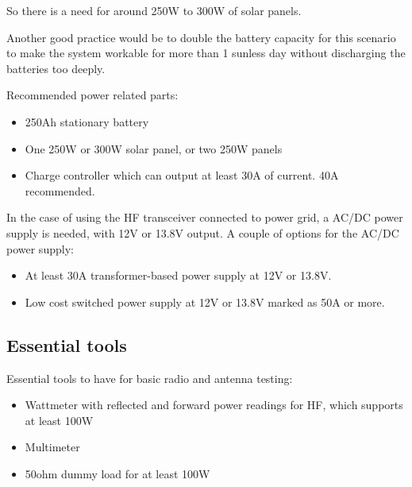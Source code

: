 \documentclass[11pt,a4paper]{article}
\begin{document}
So there is a need for around 250W to 300W of solar panels.

Another good practice would be to double the battery capacity for this
scenario to make the system workable for more than 1 sunless day without
discharging the batteries too deeply.

Recommended power related parts:
\begin{itemize}
\item 250Ah stationary battery
\item One 250W or 300W solar panel, or two 250W panels
\item Charge controller which can output at least 30A of current. 40A
  recommended.
\end{itemize}

In the case of using the HF transceiver connected to power grid, a AC/DC
power supply is needed, with 12V or 13.8V output. A couple of options for
the AC/DC power supply:


\begin{itemize}
\item At least 30A transformer-based power supply at 12V or 13.8V.
\item Low cost switched power supply at 12V or 13.8V marked as 50A or more.
\end{itemize}

\subsection{Essential tools}

Essential tools to have for basic radio and antenna testing:
\begin{itemize}
\item Wattmeter with reflected and forward power readings for HF, which
  supports at least 100W
\item Multimeter
\item 50ohm dummy load for at least 100W
\end{itemize}
\end{document}
